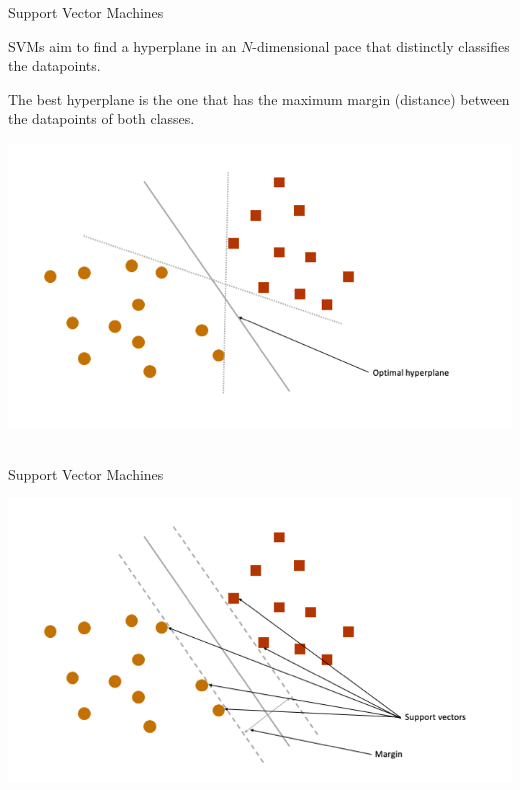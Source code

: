 \documentclass[handout]{beamer}
\begin{document}
\begin{frame}{Support Vector Machines}
	
	SVMs aim to find a hyperplane in an \(N\)-dimensional pace that distinctly classifies the datapoints.
	
	The best hyperplane is the one that has the maximum margin (distance) between the datapoints of both classes.
	
	\begin{center}
		\includegraphics[width=\linewidth,height=0.5\textheight,keepaspectratio]{../pictures/optimal_hyperplane.png} \\\
	\end{center}
	
\end{frame}

\begin{frame}{Support Vector Machines}
	
	\begin{center}
		\includegraphics[width=\linewidth,height=\textheight,keepaspectratio]{../pictures/SVM.png} \\\
	\end{center}
	
\end{frame}
\end{document}
